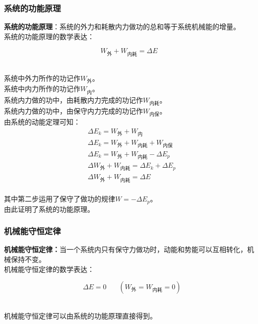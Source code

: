\documentclass[UTF8]{ctexart}
\begin{document}
\newpage

\subsubsection{系统的功能原理}
    \setcounter{equation}{0}
    \textbf{系统的功能原理}：系统的外力和耗散内力做功的总和等于系统机械能的增量。\\[3mm]
    系统的功能原理的数学表达：
    \begin{large}
        \begin{equation*}
            W_{\text{外}}+W_{\text{内耗}}=\Delta E
        \end{equation*}
    \end{large}\\
    系统中外力所作的功记作$W_{\text{外}}$。\\[3mm]
    系统中内力所作的功记作$W_{\text{内}}$。\\[3mm]
    系统内力做的功中，由耗散内力完成的功记作$W_{\text{内耗}}$。\\[3mm]
    系统内力做的功中，由保守内力完成的功记作$W_{\text{内保}}$。\\[6mm]
    由系统的动能定理可知：
    \begin{align}
        &\Delta E_k=W_{\text{外}}+W_{\text{内}}\\[3mm]
        &\Delta E_k=W_{\text{外}}+W_{\text{内耗}}+W_{\text{内保}}\\[3mm]
        &\Delta E_k=W_{\text{外}}+W_{\text{内耗}}-\Delta E_p\\[3mm]
        &\Delta W_{\text{外}}+W_{\text{内耗}}=\Delta E_k+\Delta E_p\\[3mm]
        &\Delta W_{\text{外}}+W_{\text{内耗}}=\Delta E
    \end{align}\\
    其中第二步运用了保守了做功的规律$W=-\Delta E_p$。\\[3mm]
    由此证明了系统的功能原理。\\

\subsubsection{机械能守恒定律}
    \textbf{机械能守恒定律：}当一个系统内只有保守力做功时，动能和势能可以互相转化，机械保持不变。\\[3mm]
    机械能守恒定律的数学表达：
    \begin{large}
        \begin{equation*}
            ~~~~\Delta E=0~~~~~~~~(W_{\text{外}}=W_{\text{内耗}}=0)
        \end{equation*}
    \end{large}\\
    机械能守恒定律可以由系统的功能原理直接得到。
\end{document}
